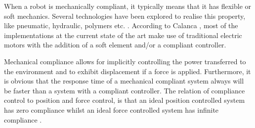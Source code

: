 When a robot is mechanically compliant, it typically means that it has flexible or soft mechanics. Several technologies have been explored to realise this property, like pneumatic, hydraulic, polymers etc. \cite{calanca2015review}. According to Calanca \cite{calanca2015review}, most of the implementations at the current state of the art make use of traditional electric motors with the addition of a soft element and/or a compliant controller.

Mechanical compliance allows for implicitly controlling the power transferred to the environment and to exhibit displacement if a force is applied. Furthermore, it is obvious that the response time of a mechanical compliant system always will be faster than a system with a compliant controller. The relation of compliance control to position and force control, is that an ideal position controlled system has zero compliance whilst an ideal force controlled system has infinite compliance \cite{calanca2015review}. 



